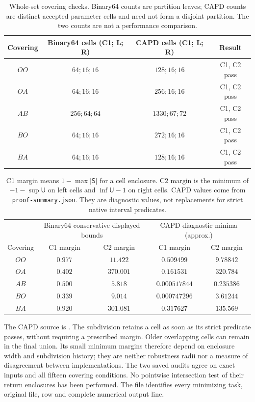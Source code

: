 \begin{table}[ht]
\centering\small
\begin{tabular}{@{}c cc c@{}}\toprule
Covering & Binary64 cells (C1; L; R) & CAPD cells (C1; L; R) & Result\\\midrule
$OO$ & $64;16;16$ & $128;16;16$ & C1, C2 pass\\
$OA$ & $64;16;16$ & $256;16;16$ & C1, C2 pass\\
$AB$ & $256;64;64$ & $1330;67;72$ & C1, C2 pass\\
$BO$ & $64;16;16$ & $272;16;16$ & C1, C2 pass\\
$BA$ & $64;16;16$ & $128;16;16$ & C1, C2 pass\\\bottomrule
\end{tabular}
\caption{Whole-set covering checks. Binary64 counts are partition leaves;
CAPD counts are distinct accepted parameter cells and need not form a
disjoint partition. The two counts are not a performance comparison.}
\label{tab:counts}
\end{table}

\begin{table}[ht]
\centering\small
\begin{tabular}{@{}c cc cc@{}}\toprule
 & \multicolumn{2}{c}{Binary64 conservative displayed bounds}
 & \multicolumn{2}{c}{CAPD diagnostic minima (approx.)}\\
Covering & C1 margin & C2 margin & C1 margin & C2 margin\\\midrule
$OO$ & $0.977$ & $11.422$ & $0.509499$ & $9.78842$\\
$OA$ & $0.402$ & $370.001$ & $0.161531$ & $320.784$\\
$AB$ & $0.500$ & $5.818$ & $0.000517844$ & $0.235386$\\
$BO$ & $0.339$ & $9.014$ & $0.000747296$ & $3.61244$\\
$BA$ & $0.920$ & $301.081$ & $0.317627$ & $135.569$\\\bottomrule
\end{tabular}
\caption{C1 margin means $1-\max|\mathsf S|$ for a cell enclosure. C2 margin
is the minimum of $-1-\sup\mathsf U$ on left cells and
$\inf\mathsf U-1$ on right cells. CAPD values come from \texttt{proof-summary.json}.
They are diagnostic values, not replacements for strict native interval
predicates.}
\label{tab:margins}
\end{table}

The CAPD source is
.
The subdivision retains a cell as soon as its strict predicate passes,
without requiring a prescribed margin. Older overlapping cells can remain
in the final union. Its small minimum margins therefore depend on enclosure
width and subdivision history; they are neither robustness radii nor a
measure of disagreement between implementations. The two saved audits agree
on exact inputs and all fifteen covering conditions. No pointwise
intersection test of their return enclosures has been performed. The file
 identifies every minimizing
task, original file, row and complete numerical output line.

